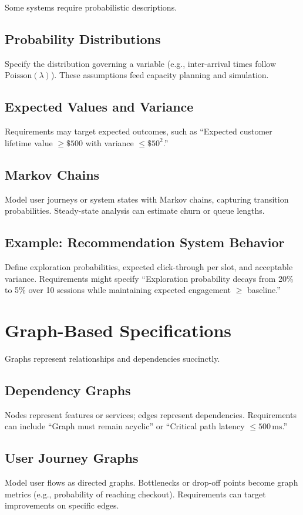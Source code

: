 Some systems require probabilistic descriptions.

\subsection{Probability Distributions}
Specify the distribution governing a variable (e.g., inter-arrival times follow $\text{Poisson}(\lambda)$). These assumptions feed capacity planning and simulation.

\subsection{Expected Values and Variance}
Requirements may target expected outcomes, such as ``Expected customer lifetime value $\ge \$500$ with variance $\le \$50^2$.'' 

\subsection{Markov Chains}
Model user journeys or system states with Markov chains, capturing transition probabilities. Steady-state analysis can estimate churn or queue lengths.

\subsection{Example: Recommendation System Behavior}
Define exploration probabilities, expected click-through per slot, and acceptable variance. Requirements might specify ``Exploration probability decays from 20\% to 5\% over 10 sessions while maintaining expected engagement $\ge$ baseline.''

\section{Graph-Based Specifications}
\label{sec:graph-based}

Graphs represent relationships and dependencies succinctly.

\subsection{Dependency Graphs}
Nodes represent features or services; edges represent dependencies. Requirements can include ``Graph must remain acyclic'' or ``Critical path latency $\le 500\,\text{ms}$.'' 

\subsection{User Journey Graphs}
Model user flows as directed graphs. Bottlenecks or drop-off points become graph metrics (e.g., probability of reaching checkout). Requirements can target improvements on specific edges.

